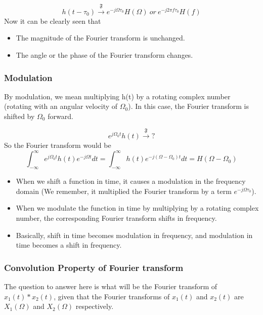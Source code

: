 \begin{equation}
h(t-\tau_0) \xrightarrow{\mathfrak{F}} e^{-j\Omega \tau_0} H(\Omega)\   or\   e^{-j2\pi f\tau_0} H(f)
\end{equation}
\noindent
Now it can be clearly seen that
\begin{itemize}
\item The magnitude of the Fourier transform is unchanged.
\item The angle or the phase of the Fourier transform changes.
\end{itemize}


\subsubsection{Modulation}
By modulation, we mean multiplying h(t) by a rotating complex number (rotating with an angular velocity of $\Omega_0$). In this case, the Fourier transform is shifted by $\Omega_0$ forward.

\begin{equation}
e^{j\Omega_0 t} h(t) \xrightarrow{\mathfrak{F}} {?}
\end{equation}
\noindent
So the Fourier transform would be
\begin{equation}
 \int_{-\infty}^{\infty} {e^{j\Omega_0 t}h(t)e^{-j\Omega t}} dt=
 \int_{-\infty}^{\infty} {h(t)e^{-j(\Omega-\Omega_0) t}} dt=
 H(\Omega-\Omega_0)
\end{equation}
\noindent
\begin{itemize}

\item When we shift a function in time, it causes a modulation in the frequency domain (We remember, it multiplied the Fourier transform by a term $e^{-j\Omega \tau_0}$).

\item When we modulate the function in time by multiplying by a rotating complex number, the corresponding Fourier transform shifts in frequency.

\item Basically, shift in time becomes modulation in frequency, and modulation in time becomes a shift in frequency.

\end{itemize}

\subsubsection{Convolution Property of Fourier transform}
The question to answer here is what will be the Fourier transform of $x_1(t)*x_2(t)$, given that the Fourier transforms of $x_1(t)$ and $x_2(t)$ are $X_1(\Omega)$ and $X_2(\Omega)$ respectively. 

